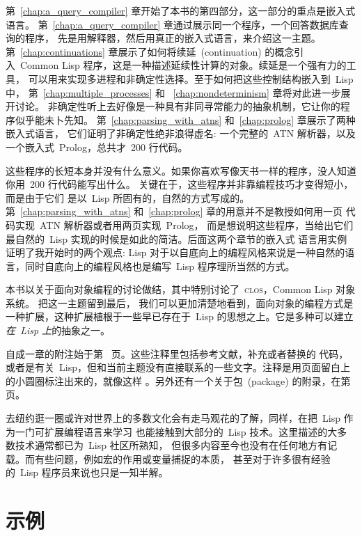 第~\ref{chap:a_query_compiler} 章开始了本书的第四部分，这一部分的重点是嵌入式语言。
第~\ref{chap:a_query_compiler} 章通过展示同一个程序，一个回答数据库查询的程序，
先是用解释器，然后用真正的嵌入式语言，来介绍这一主题。
第~\ref{chap:continuations} 章展示了如何将续延~(continuation) 的概念引入~Common Lisp
程序，这是一种描述延续性计算的对象。续延是一个强有力的工具，
可以用来实现多进程和非确定性选择。至于如何把这些控制结构嵌入到~Lisp 中，
第~\ref{chap:multiple_processes} 和
~\ref{chap:nondeterminism} 章将对此进一步展开讨论。
非确定性听上去好像是一种具有非同寻常能力的抽象机制，它让你的程序似乎能未卜先知。
第~\ref{chap:parsing_with_atns} 和~\ref{chap:prolog} 章展示了两种嵌入式语言，
它们证明了非确定性绝非浪得虚名: 一个完整的~ATN 解析器，以及一个嵌入式~Prolog，总共才~200
行代码。

这些程序的长短本身并没有什么意义。如果你喜欢写像天书一样的程序，没人知道
你用~200 行代码能写出什么。
关键在于，这些程序并非靠编程技巧才变得短小，而是由于它们
是以~Lisp 所固有的，自然的方式写成的。
第~\ref{chap:parsing_with_atns} 和~\ref{chap:prolog} 章的用意并不是教授如何用一页
代码实现~ATN 解析器或者用两页实现~Prolog，
而是想说明这些程序，当给出它们最自然的~Lisp 实现的时候是如此的简洁。后面这两个章节的嵌入式
语言用实例证明了我开始时的两个观点:
Lisp 对于以自底向上的编程风格来说是一种自然的语言，同时自底向上的编程风格也是编写~Lisp
程序理所当然的方式。

本书以关于面向对象编程的讨论做结，其中特别讨论了~\textsc{clos}，Common Lisp 对象系统。
把这一主题留到最后，
我们可以更加清楚地看到，面向对象的编程方式是一种扩展，这种扩展植根于一些早已存在于~Lisp
的思想之上。它是多种可以建立\emph{在~Lisp 上}的抽象之一。

自成一章的附注始于第~\pageref{chap:notes} 页。这些注释里包括参考文献，补充或者替换的
代码，
或者是有关~Lisp，但和当前主题没有直接联系的一些文字。注释是用页面留白上的小圆圈标注出来的，就像这样
\bubblenote。另外还有一个关于包~(package) 的附录，在第~\pageref{chap:packages} 页。

去纽约逛一圈或许对世界上的多数文化会有走马观花的了解，同样，在把~Lisp 作为一门可扩展编程语言来学习
也能接触到大部分的~Lisp 技术。这里描述的大多数技术通常都已为~Lisp 社区所熟知，
但很多内容至今也没有在任何地方有记载。而有些问题，例如宏的作用或变量捕捉的本质，
甚至对于许多很有经验的~Lisp 程序员来说也只是一知半解。

\section*{示例}
\label{sec:examples}

